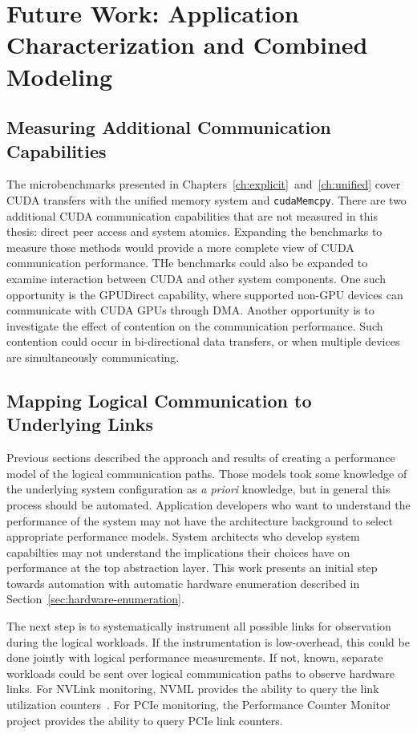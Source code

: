 \chapter{Future Work: Application Characterization and Combined Modeling}
\label{ch:future}

\section{Measuring Additional Communication Capabilities}

The microbenchmarks presented in Chapters~\ref{ch:explicit}~and~\ref{ch:unified} cover CUDA transfers with the unified memory system and \texttt{cudaMemcpy}.
There are two additional CUDA communication capabilities that are not measured in this thesis: direct peer access and system atomics.
Expanding the benchmarks to measure those methods would provide a more complete view of CUDA communication performance.
THe benchmarks could also be expanded to examine interaction between CUDA and other system components.
One such opportunity is the GPUDirect capability, where supported non-GPU devices can communicate with CUDA GPUs through DMA.
Another opportunity is to investigate the effect of contention on the communication performance.
Such contention could occur in bi-directional data transfers, or when multiple devices are simultaneously communicating.

\section{Mapping Logical Communication to Underlying Links}
\label{sec:map-underlying}

Previous sections described the approach and results of creating a performance model of the logical communication paths.
Those models took some knowledge of the underlying system configuration as \textit{a priori} knowledge, but in general this process should be automated.
Application developers who want to understand the performance of the system may not have the architecture background to select appropriate performance models.
System architects who develop system capabilties may not understand the implications their choices have on performance at the top abstraction layer.
This work presents an initial step towards automation with automatic hardware enumeration described in Section~\ref{sec:hardware-enumeration}.

The next step is to systematically instrument all possible links for observation during the logical workloads.
If the instrumentation is low-overhead, this could be done jointly with logical performance measurements.
If not, known, separate workloads could be sent over logical communication paths to observe hardware links.
For NVLink monitoring, NVML provides the ability to query the link utilization counters~\cite{nvidia2017nvmlreference}.
For PCIe monitoring, the Performance Counter Monitor~\cite{opcm2018pcm} project provides the ability to query PCIe link counters.


